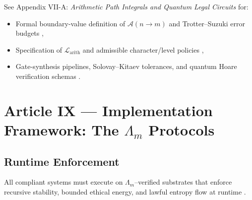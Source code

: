 \documentclass[12pt]{amsart}
\theoremstyle{plain}
\begin{document}
See Appendix VII-A: \emph{Arithmetic Path Integrals and Quantum Legal Circuits} for:
\begin{itemize}
  \item Formal boundary-value definition of $\mathcal{A}(n\!\to\!m)$ and Trotter–Suzuki error budgets \cite{trotter1959product,suzuki1976generalized},
  \item Specification of $\mathcal{L}_{\mathrm{arith}}$ and admissible character/level policies \cite{davenport2000multiplicative,iwaniec2004analytic},
  \item Gate-synthesis pipelines, Solovay–Kitaev tolerances, and quantum Hoare verification schemas \cite{nielsen2010quantum,dawson2005solovay,ying2016foundations}.
\end{itemize}
\section{Article IX — Implementation Framework: The $\Lambda_m$ Protocols}

\subsection{Runtime Enforcement}

All compliant systems must execute on $\Lambda_m$–verified substrates that enforce recursive stability, bounded ethical energy, and lawful entropy flow at runtime \cite{vanGelder2025pirtm}.
\end{document}
